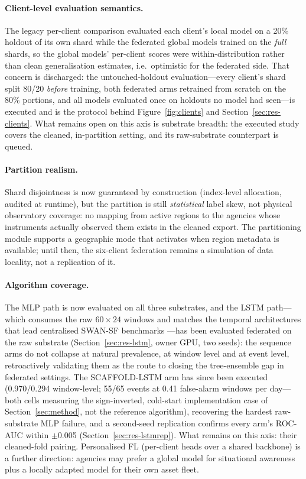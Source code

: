 \paragraph{Client-level evaluation semantics.}
The legacy per-client comparison evaluated each client's local model
on a 20\% holdout of its own shard while the federated global models
trained on the \emph{full} shards, so the global models' per-client
scores were within-distribution rather than clean generalisation
estimates, i.e.\ optimistic for the federated side. That concern is
discharged: the untouched-holdout evaluation---every client's shard
split 80/20 \emph{before} training, both federated arms retrained
from scratch on the 80\% portions, and all models evaluated once on
holdouts no model had seen---is executed and is the protocol behind
Figure~\ref{fig:clients} and Section~\ref{sec:res-clients}. What
remains open on this axis is substrate breadth: the executed study
covers the cleaned, in-partition setting, and its raw-substrate
counterpart is queued.

\paragraph{Partition realism.}
Shard disjointness is now guaranteed by construction (index-level
allocation, audited at runtime), but the partition is still
\emph{statistical} label skew, not physical observatory coverage: no
mapping from active regions to the agencies whose instruments actually
observed them exists in the cleaned export. The partitioning module
supports a geographic mode that activates when region metadata is
available; until then, the six-client federation remains a simulation
of data locality, not a replication of it.

\paragraph{Algorithm coverage.}
The MLP path is now evaluated on all three substrates, and the LSTM
path---which consumes the raw $60\times24$ windows and matches the
temporal
architectures that lead centralised SWAN-SF benchmarks
\cite{hassani2025}---has been evaluated federated on the raw
substrate (Section~\ref{sec:res-lstm}, owner GPU, two seeds): the
sequence arms do not collapse at natural prevalence, at window
level and at event level, retroactively
validating them as the route to closing the tree-ensemble gap in
federated settings. The SCAFFOLD-LSTM arm has since been executed
(0.970/0.294 window-level; 55/65 events at 0.41 false-alarm windows
per day---both cells measuring the sign-inverted, cold-start
implementation case of Section~\ref{sec:method}, not the reference
algorithm), recovering the hardest raw-substrate MLP failure, and a
second-seed replication confirms every arm's ROC-AUC within
$\pm$0.005 (Section~\ref{sec:res-lstmrep}). What remains on
this axis: their cleaned-fold
pairing. Personalised FL
(per-client heads over a shared backbone) is a further direction:
agencies may prefer a global model for situational awareness plus a
locally adapted model for their
own asset fleet.

